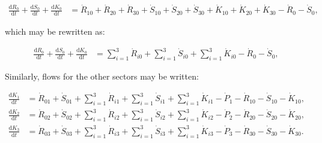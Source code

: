\begin{align} \label{eq:C_CV_0}
	\frac{\mathrm{d}R_{0}}{\mathrm{d}t} 
	+ \frac{\mathrm{d}S_{0}}{\mathrm{d}t}	
	+ \frac{\mathrm{d}K_0}{\mathrm{d}t}		
	& =  \dot{R}_{10} + \dot{R}_{20} + \dot{R}_{30}
	+ \dot{S}_{10} + \dot{S}_{20} + \dot{S}_{30}
	+ \dot{K}_{10} + \dot{K}_{20} + \dot{K}_{30}
	- \dot{R}_{0} 
	- \dot{S}_{0},
\end{align}

\noindent which may be rewritten as:

\begin{align} \label{eq:C_CV_0_b}
	\frac{\mathrm{d}R_{0}}{\mathrm{d}t} 
	+ \frac{\mathrm{d}S_{0}}{\mathrm{d}t}	
	+ \frac{\mathrm{d}K_0}{\mathrm{d}t}		
	& =  \sum_{i = 1}^{3}\dot{R}_{i0}
	+ \sum_{i = 1}^{3}\dot{S}_{i0}
	+ \sum_{i = 1}^{3}\dot{K}_{i0}
	- \dot{R}_{0} 
	- \dot{S}_{0},
\end{align}

Similarly, flows for the other sectors may be written:

\begin{align} \label{eq:C_CV_1}
	\frac{\mathrm{d}K_{1}}{\mathrm{d}t}		
	& =  \dot{R}_{01} 
	+ \dot{S}_{01}
	+ \sum_{i = 1}^{3}\dot{R}_{i1}
	+ \sum_{i = 1}^{3}\dot{S}_{i1}
	+ \sum_{i = 1}^{3}\dot{K}_{i1}
	- \dot{P}_{1}
	- \dot{R}_{10} 
	- \dot{S}_{10}
	- \dot{K}_{10},										\\
	\label{eq:C_CV_2}
	\frac{\mathrm{d}K_{2}}{\mathrm{d}t}		
	& =  \dot{R}_{02} 
	+ \dot{S}_{02}
	+ \sum_{i = 1}^{3}\dot{R}_{i2}
	+ \sum_{i = 1}^{3}\dot{S}_{i2}
	+ \sum_{i = 1}^{3}\dot{K}_{i2}
	- \dot{P}_{2}
	- \dot{R}_{20} 
	- \dot{S}_{20}
	- \dot{K}_{20},										\\	
	\label{eq:C_CV_3}
	\frac{\mathrm{d}K_{3}}{\mathrm{d}t}		
	& =  \dot{R}_{03} 
	+ \dot{S}_{03}
	+ \sum_{i = 1}^{3}\dot{R}_{i3}
	+ \sum_{i = 1}^{3}\dot{S}_{i3}
	+ \sum_{i = 1}^{3}\dot{K}_{i3}
	- \dot{P}_{3}
	- \dot{R}_{30} 
	- \dot{S}_{30}
	- \dot{K}_{30}.										
\end{align}

%

